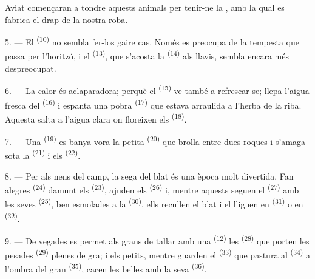 Aviat començaran a tondre aquests animals per tenir-ne la , amb la
qual es fabrica el drap de la nostra roba.

\VUsaut{5.0mm}
\VUsaut{3.4mm}

5. --- El  \textsuperscript{(10)} no sembla fer-los gaire cas. Només
es preocupa de la tempesta que passa per l'horitzó, i el 
\textsuperscript{(13)}, que s'acosta la 
\textsuperscript{(14)} als llavis, sembla encara més despreocupat.

6. --- La calor és aclaparadora; perquè el  \textsuperscript{(15)} ve
també a refrescar-se; llepa l'aigua fresca del 
\textsuperscript{(16)} i espanta una pobra 
\textsuperscript{(17)} que estava arraulida a l'herba de la riba. Aquesta salta a
l'aigua clara on floreixen els  \textsuperscript{(18)}.

7. --- Una  \textsuperscript{(19)} es banya vora la petita
 \textsuperscript{(20)} que brolla entre dues roques i s'amaga sota la
 \textsuperscript{(21)} i els 
\textsuperscript{(22)}.

\VUsaut{5.0mm}
\VUsaut{3.4mm}

8. --- Per als nens del camp, la sega del blat és una època molt divertida. Fan
alegres  \textsuperscript{(24)} damunt els  \textsuperscript{(23)}, ajuden els 
\textsuperscript{(26)} i, mentre aquests seguen el 
\textsuperscript{(27)} amb les seves  \textsuperscript{(25)}, ben
esmolades a la  \textsuperscript{(30)}, ells recullen el
blat i el lliguen en  \textsuperscript{(31)} o en 
\textsuperscript{(32)}.

9. --- De vegades es permet als grans de tallar amb una 
\textsuperscript{(12)} les  \textsuperscript{(28)} que
porten les pesades  \textsuperscript{(29)} plenes de gra; i els
petits, mentre guarden el  \textsuperscript{(33)} que pastura al
 \textsuperscript{(34)} a l'ombra del gran 
\textsuperscript{(35)}, cacen les belles  amb la seva
 \textsuperscript{(36)}.

